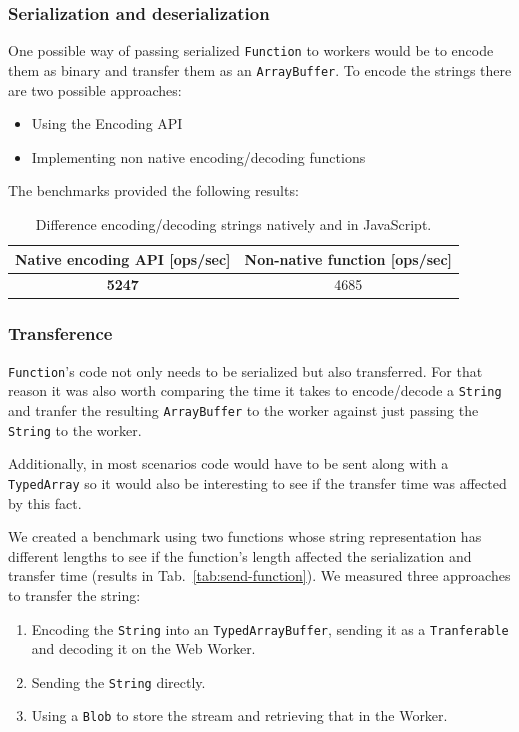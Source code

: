 \documentclass[runningheads,a4paper]{llncs}
\begin{document}
\subsubsection{Serialization and deserialization}
One possible way of passing serialized \verb+Function+ to workers would be to encode them as binary and transfer them as an \verb+ArrayBuffer+. To encode the strings there are two possible approaches:
\begin{itemize}
  \item Using the Encoding API\cite{encoding-api}
  \item Implementing non native encoding/decoding functions
\end{itemize}

The benchmarks provided the following results:
\begin{table}
  \centering
  \begin{tabular}{|c|c|}
    \hline
    Native encoding API [ops/sec] & Non-native function [ops/sec] \\
    \hline
    \textbf{5247} & 4685 \\
    \hline
  \end{tabular}
  \caption{Difference encoding/decoding strings natively and in JavaScript.}
  \label{tab:encode-decode}
\end{table}

\subsubsection{Transference}
\verb+Function+'s code not only needs to be serialized but also transferred. For that reason it was also worth comparing the time it takes to encode/decode a \verb+String+ and tranfer the resulting \verb+ArrayBuffer+ to the worker against just passing the \verb+String+ to the worker.

Additionally, in most scenarios code would have to be sent along with a \verb+TypedArray+ so it would also be interesting to see if the transfer time was affected by this fact.

We created a benchmark using two functions whose string representation has different lengths to see if the function's length affected the serialization and transfer time (results in Tab.~\ref{tab:send-function}). We measured three approaches to transfer the string:
\begin{enumerate}
  \item Encoding the \verb+String+ into an \verb+TypedArrayBuffer+, sending it as a \verb+Tranferable+ and decoding it on the Web Worker.
  \item Sending the \verb+String+ directly.
  \item Using a \verb+Blob+ to store the stream and retrieving that in the Worker.
\end{enumerate}
\end{document}

